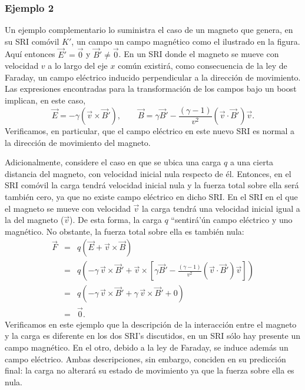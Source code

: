 \subsubsection{Ejemplo 2}
Un ejemplo complementario lo suministra el caso de un magneto que genera, en su SRI comóvil $K'$, un campo un campo magnético como el ilustrado en la figura. Aquí entonces $\vec{E}'=\vec{0}$ y $\vec{B}'\neq\vec{0}$. En un SRI donde el magneto se mueve con velocidad $v$ a lo largo del eje $x$ común existirá, como consecuencia de la ley de Faraday, un campo eléctrico inducido perpendicular a la dirección de movimiento. Las expresiones encontradas para la transformación de los campos bajo un boost implican, en este caso,
\begin{equation}
 \vec{E}=-\gamma\left(\vec{v}\times\vec{B}'\right), \qquad
\vec{B}=\gamma \vec{B}'-\frac{(\gamma -1)}{v^2}\left( \vec{v}\cdot
\vec{B}'\right) \vec{v}.
\end{equation}
Verificamos, en particular, que el campo eléctrico en este nuevo SRI es normal a la dirección de movimiento del magneto.

Adicionalmente, considere el caso en que se ubica una carga $q$ a una cierta distancia del magneto, con velocidad inicial nula respecto de él. Entonces, en el SRI comóvil la carga tendrá velocidad inicial nula y la fuerza total sobre ella será también cero, ya que no existe campo eléctrico en dicho SRI. En el SRI en el que el magneto se mueve con velocidad $\vec{v}$ la carga tendrá una velocidad inicial igual a la del magneto ($\vec{v}$). De esta forma, la carga $q$ ``sentirá'ún campo eléctrico y uno magnético. No obstante, la fuerza total sobre ella es también nula:
\begin{eqnarray}
\vec{F}&=&q\left(\vec{E}+\vec{v}\times\vec{B}\right) \\
&=&q\left(-\gamma\,\vec{v}\times\vec{B}'+ \vec{v}\times\left[\gamma \vec{B}'-\frac{(\gamma -1)}{v^2}\left( \vec{v}\cdot
\vec{B}'\right) \vec{v}\right]\right)\\
&=&q\left(-\gamma\, \vec{v}\times\vec{B}'+\gamma\,\vec{v}\times\vec{B}'+0\right)\\
&=&\vec{0}.
\end{eqnarray}
Verificamos en este ejemplo que la descripción de la interacción entre el magneto y la carga es diferente en los dos SRI's discutidos, en un SRI sólo hay presente un campo magnético. En el otro, debido a la ley de Faraday, se induce además un campo eléctrico. Ambas descripciones, sin embargo, conciden en su predicción final: la carga no alterará su estado de movimiento ya que la fuerza sobre ella es nula.


